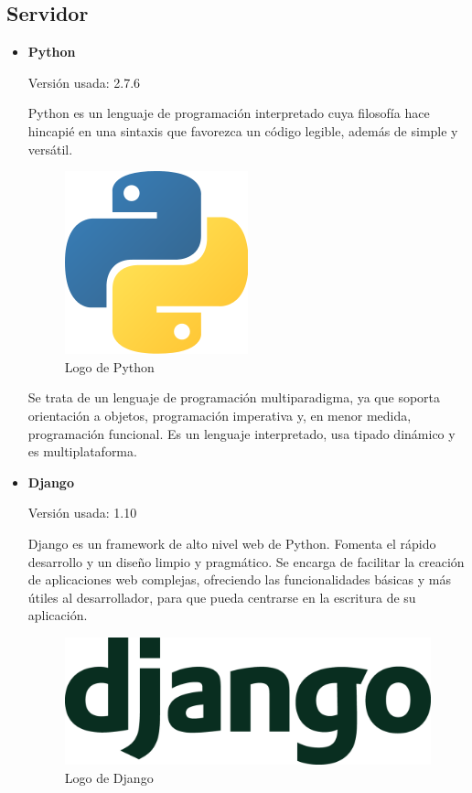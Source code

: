 \bigskip
\subsection{Servidor}
\bigskip

\begin{itemize}
	\item \textbf{Python}
	
		Versión usada: 2.7.6
		
		Python \cite{python} es un lenguaje de programación interpretado cuya filosofía hace hincapié en una sintaxis que favorezca un código legible, además de simple y versátil.
				
		\bigskip
		\begin{figure}[h]
			\centering
			\includegraphics[width=0.2\linewidth]{../images/python}
			\caption[Logo de Python]{Logo de Python}
			\label{fig:pythonlogo}
		\end{figure}
		
		Se trata de un lenguaje de programación multiparadigma, ya que soporta orientación a objetos, programación imperativa y, en menor medida, programación funcional. Es un lenguaje interpretado, usa tipado dinámico y es multiplataforma.
		
	\item \textbf{Django}
	
		Versión usada: 1.10
		
		Django \cite{django} es un framework de alto nivel web de Python. Fomenta el rápido desarrollo y un diseño limpio y pragmático. Se encarga de facilitar la creación de aplicaciones web complejas, ofreciendo las funcionalidades básicas y más útiles al desarrollador, para que pueda centrarse en la escritura de su aplicación.
		
		\bigskip
		\begin{figure}[h]
			\centering
			\includegraphics[width=0.3\linewidth]{../images/djangologo}
			\caption[Logo de Django]{Logo de Django}
			\label{fig:djangologo}
		\end{figure}
				

\end{itemize}
